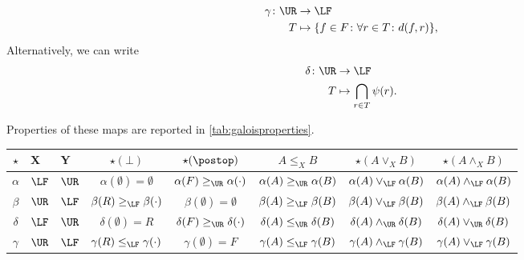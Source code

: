\begin{equation}
  \label{eq:galoisgamma}
  \begin{aligned}
    \gamma \colon \UR&\to \LF\\
    T&\mapsto \{f\in F \colon \forall {r\in T}\colon d(f,r)\},
  \end{aligned}
\end{equation}
Alternatively, we can write
\begin{equation}
  \begin{aligned}
    \delta\colon \UR &\to \LF\\
    T&\mapsto \bigcap_{r\in T}\psi(r).
  \end{aligned}
\end{equation}

\noindent Properties of these maps are reported in \cref{tab:galoisproperties}.


\begin{table*}[h!]
  \centering
      \begin{tabular}{c|l|l|c|c|c|c|c}
        $\star$ & X & Y & $\star(\bot)$ & $\star(\postop)$ & $A\leq_X B$ & $\star(A\vee_X B)$ & $\star(A\wedge_X B)$ \\
        \hline
        $\alpha$ & $\LF$ & $\UR$ & $\alpha(\emptyset)=\emptyset$ & $\alpha(F)\geq_{\UR} \alpha(\cdot)$
        & $\alpha(A)\geq_{\UR} \alpha(B)$
        & $\alpha(A)\vee_{\LF}\alpha(B)$
        & $\alpha(A)\wedge_{\LF}\alpha(B)$
        \\
        \hline
        $\beta$ & $\UR$ & $\LF$ & $\beta(R)\geq_{\LF}\beta(\cdot)$ & $\beta(\emptyset)=\emptyset$
        & $\beta(A)\geq_{\LF} \beta(B)$
        & $\beta(A)\vee_{\LF}\beta(B)$
        & $\beta(A)\wedge_{\LF}\beta(B)$
        \\
        \hline
        $\delta$ & $\LF$ & $\UR$ & $\delta(\emptyset)=R$ & $\delta(F)\geq_{\UR}\delta(\cdot)$ & $\delta(A)\leq_{\UR} \delta(B)$
        & $\delta(A)\wedge_{\UR}\delta(B)$
        & $\delta(A)\vee_{\UR}\delta(B)$
        \\
        \hline
        $\gamma$ & $\UR$ & $\LF$ & $\gamma(R)\leq_{\LF}\gamma(\cdot)$ & $\gamma(\emptyset)=F$ & $\gamma(A) \leq_{\LF} \gamma(B)$
        & $\gamma(A)\wedge_{\LF}\gamma(B)$
        & $\gamma(A)\vee_{\LF}\gamma(B)$
      \end{tabular}
    \caption{Properties of $\alpha,\beta,\delta,\gamma$}
    \label{tab:galoisproperties}
\end{table*}

